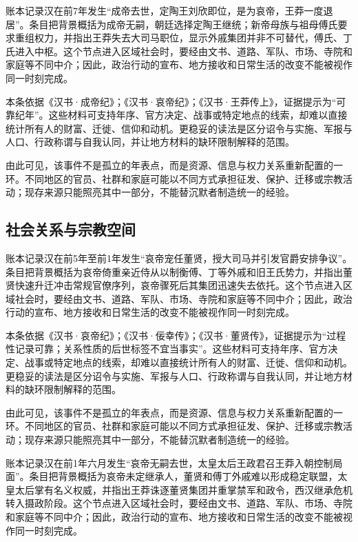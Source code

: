 账本记录汉在前7年发生“成帝去世，定陶王刘欣即位，是为哀帝，王莽一度退居”。条目把背景概括为成帝无嗣，朝廷选择定陶王继统；新帝母族与祖母傅氏要求重组权力，并指出王莽失去大司马职位，显示外戚集团并非不可替代，傅氏、丁氏进入中枢。这个节点进入区域社会时，要经由文书、道路、军队、市场、寺院和家庭等不同中介；因此，政治行动的宣布、地方接收和日常生活的改变不能被视作同一时刻完成。

本条依据《汉书·成帝纪》；《汉书·哀帝纪》；《汉书·王莽传上》，证据提示为“可靠纪年”。这些材料可支持年序、官方决定、战事或特定地点的线索，却难以直接统计所有人的财富、迁徙、信仰和动机。更稳妥的读法是区分诏令与实施、军报与人口、行政称谓与自我认同，并让地方材料的缺环限制解释的范围。

由此可见，该事件不是孤立的年表点，而是资源、信息与权力关系重新配置的一环。不同地区的官员、社群和家庭可能以不同方式承担征发、保护、迁移或宗教活动；现存来源只能照亮其中一部分，不能替沉默者制造统一的经验。

\subsection{社会关系与宗教空间}

账本记录汉在前5年至前1年发生“哀帝宠任董贤，授大司马并引发官爵安排争议”。条目把背景概括为哀帝倚重亲近侍从以制衡傅、丁等外戚和旧王氏势力，并指出董贤快速升迁冲击常规官僚序列，哀帝骤死后其集团迅速失去依托。这个节点进入区域社会时，要经由文书、道路、军队、市场、寺院和家庭等不同中介；因此，政治行动的宣布、地方接收和日常生活的改变不能被视作同一时刻完成。

本条依据《汉书·哀帝纪》；《汉书·佞幸传》；《汉书·董贤传》，证据提示为“过程性记录可靠；关系性质的后世标签不宜当事实”。这些材料可支持年序、官方决定、战事或特定地点的线索，却难以直接统计所有人的财富、迁徙、信仰和动机。更稳妥的读法是区分诏令与实施、军报与人口、行政称谓与自我认同，并让地方材料的缺环限制解释的范围。

由此可见，该事件不是孤立的年表点，而是资源、信息与权力关系重新配置的一环。不同地区的官员、社群和家庭可能以不同方式承担征发、保护、迁移或宗教活动；现存来源只能照亮其中一部分，不能替沉默者制造统一的经验。

账本记录汉在前1年六月发生“哀帝无嗣去世，太皇太后王政君召王莽入朝控制局面”。条目把背景概括为哀帝未定继承人，董贤和傅丁外戚难以形成稳定联盟，太皇太后掌有名义权威，并指出王莽诛逐董贤集团并重掌禁军和政令，西汉继承危机转入摄政阶段。这个节点进入区域社会时，要经由文书、道路、军队、市场、寺院和家庭等不同中介；因此，政治行动的宣布、地方接收和日常生活的改变不能被视作同一时刻完成。

